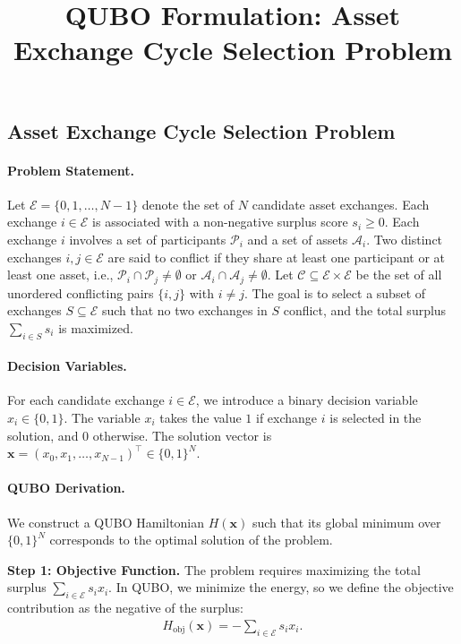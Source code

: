\documentclass[12pt]{article}
\title{QUBO Formulation: Asset Exchange Cycle Selection Problem}
\date{}
\begin{document}
\maketitle

\subsection*{Asset Exchange Cycle Selection Problem}

\paragraph{Problem Statement.}
Let $\mathcal{E} = \{0, 1, \dots, N-1\}$ denote the set of $N$ candidate asset exchanges. Each exchange $i \in \mathcal{E}$ is associated with a non-negative surplus score $s_i \ge 0$. Each exchange $i$ involves a set of participants $\mathcal{P}_i$ and a set of assets $\mathcal{A}_i$. Two distinct exchanges $i, j \in \mathcal{E}$ are said to conflict if they share at least one participant or at least one asset, i.e., $\mathcal{P}_i \cap \mathcal{P}_j \neq \emptyset$ or $\mathcal{A}_i \cap \mathcal{A}_j \neq \emptyset$. Let $\mathcal{C} \subseteq \mathcal{E} \times \mathcal{E}$ be the set of all unordered conflicting pairs $\{i, j\}$ with $i \neq j$. The goal is to select a subset of exchanges $S \subseteq \mathcal{E}$ such that no two exchanges in $S$ conflict, and the total surplus $\sum_{i \in S} s_i$ is maximized.

\paragraph{Decision Variables.}
For each candidate exchange $i \in \mathcal{E}$, we introduce a binary decision variable $x_i \in \{0, 1\}$. The variable $x_i$ takes the value $1$ if exchange $i$ is selected in the solution, and $0$ otherwise. The solution vector is $\mathbf{x} = (x_0, x_1, \dots, x_{N-1})^\top \in \{0, 1\}^N$.

\paragraph{QUBO Derivation.}
We construct a QUBO Hamiltonian $H(\mathbf{x})$ such that its global minimum over $\{0, 1\}^N$ corresponds to the optimal solution of the problem.

\textbf{Step 1: Objective Function.}
The problem requires maximizing the total surplus $\sum_{i \in \mathcal{E}} s_i x_i$. In QUBO, we minimize the energy, so we define the objective contribution as the negative of the surplus:
\begin{align}
    H_{\text{obj}}(\mathbf{x}) = -\sum_{i \in \mathcal{E}} s_i x_i.
\end{align}
\end{document}
